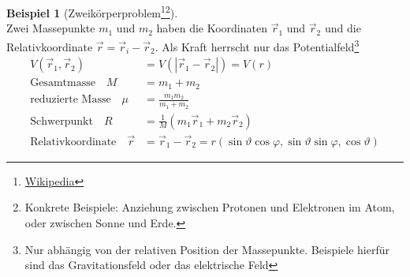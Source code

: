 \documentclass[oneside]{book}
\theoremstyle{definition}
\newtheorem*{beispiel*}{Beispiel}
\begin{document}
\begin{beispiel*}[Zweikörperproblem\footnote{\href{http://de.wikipedia.org/wiki/Zweik\%C3\%B6rperproblem}{Wikipedia}}\footnote{Konkrete Beispiele: Anziehung zwischen Protonen und Elektronen im Atom, oder zwischen Sonne und Erde.}]~\\
Zwei Massepunkte $m_1$ und $m_2$ haben die Koordinaten $\vec{r}_1$ und $\vec{r}_2$ und die Relativkoordinate $\vec{r} = \vec{r}_i - \vec{r}_2$. Als Kraft herrscht nur das Potentialfeld\footnote{Nur abhängig von der relativen Position der Massepunkte. Beispiele hierfür sind das Gravitationsfeld oder das elektrische Feld}
\begin{align*}
V(\vec{r}_1, \vec{r}_2) &= V(| \vec{r}_1 - \vec{r}_2|) = V(r)\\
\text{Gesamtmasse~~~} M &= m_1 + m_2\\
\text{reduzierte Masse~~~} \mu &= \frac{m_1 m_2}{m_1 + m_2}\\
\text{Schwerpunkt~~~} R &= \frac{1}{M} (m_1 \vec{r}_1 + m_2 \vec{r}_2)\\
\text{Relativkoordinate~~~} \vec{r} &= \vec{r}_1 - \vec{r}_2 = r (\sin \vartheta \cos \varphi, \sin \vartheta \sin \varphi, \cos \vartheta)
\end{align*}


\end{beispiel*}
\end{document}
